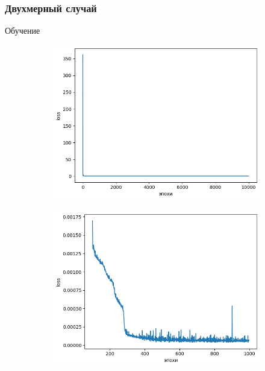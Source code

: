 \documentclass[t]{beamer}
\begin{document}
    \begin{frame}
        \frametitle{Двухмерный случай}
        Обучение
        \begin{figure}[h]
            \begin{subfigure}{0.35\textwidth}
                \center
                \includegraphics[width=\textwidth]{../plots/ek/2-dim loss 20x4.png}
            \end{subfigure}
            \begin{subfigure}{0.35\textwidth}
                \center
                \includegraphics[width=\textwidth]{../plots/ek/2-dim loss trim20x4.png}

\end{subfigure}
\end{figure}
\end{frame}
\end{document}
